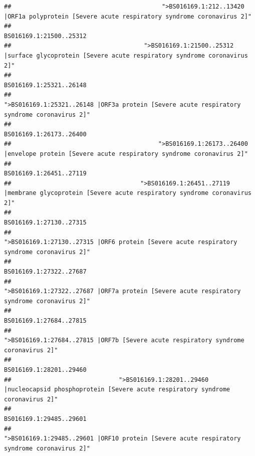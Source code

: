 \documentclass[
]{article}
\begin{document}
\begin{verbatim}
##                                          ">BS016169.1:212..13420 |ORF1a polyprotein [Severe acute respiratory syndrome coronavirus 2]" 
##                                                                                                                BS016169.1:21500..25312 
##                                     ">BS016169.1:21500..25312 |surface glycoprotein [Severe acute respiratory syndrome coronavirus 2]" 
##                                                                                                                BS016169.1:25321..26148 
##                                            ">BS016169.1:25321..26148 |ORF3a protein [Severe acute respiratory syndrome coronavirus 2]" 
##                                                                                                                BS016169.1:26173..26400 
##                                         ">BS016169.1:26173..26400 |envelope protein [Severe acute respiratory syndrome coronavirus 2]" 
##                                                                                                                BS016169.1:26451..27119 
##                                    ">BS016169.1:26451..27119 |membrane glycoprotein [Severe acute respiratory syndrome coronavirus 2]" 
##                                                                                                                BS016169.1:27130..27315 
##                                             ">BS016169.1:27130..27315 |ORF6 protein [Severe acute respiratory syndrome coronavirus 2]" 
##                                                                                                                BS016169.1:27322..27687 
##                                            ">BS016169.1:27322..27687 |ORF7a protein [Severe acute respiratory syndrome coronavirus 2]" 
##                                                                                                                BS016169.1:27684..27815 
##                                                    ">BS016169.1:27684..27815 |ORF7b [Severe acute respiratory syndrome coronavirus 2]" 
##                                                                                                                BS016169.1:28201..29460 
##                              ">BS016169.1:28201..29460 |nucleocapsid phosphoprotein [Severe acute respiratory syndrome coronavirus 2]" 
##                                                                                                                BS016169.1:29485..29601 
##                                            ">BS016169.1:29485..29601 |ORF10 protein [Severe acute respiratory syndrome coronavirus 2]" 

\end{verbatim}
\end{document}

